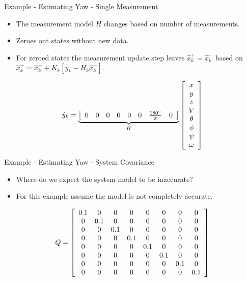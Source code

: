 \documentclass[hyperref={pdfpagelabels=false}]{beamer}
\begin{document}
\begin{frame}{Example - Estimating Yaw - Single Measurement}
\begin{itemize}
\item The measurement model $H$ changes based on number of measurements.
\item Zeroes out states without new data.
\item For zeroed states the measurement update step leaves $\hat{x}_k^+ = \hat{x}_k^-$ based on $\hat{x}_k^+ = \hat{x}_k^- + K_k\left[y_k - H_k\hat{x}_k^-\right]$.
\end{itemize}
\begin{align*}
\hat{y}_k = \underbrace{\left[\begin{array}{c c c c c c c c}
0 & 0 & 0 & 0 & 0 & 0 & \frac{180^\circ}{\pi} & 0 \\
\end{array}\right]}_{H}
\left[\begin{array}{c}
x \\ y \\ z \\ V \\ \theta \\ \phi \\ \psi \\ \omega
\end{array}\right]
\end{align*}
\end{frame}

\begin{frame}{Example - Estimating Yaw - System Covariance}
\begin{itemize}
\item Where do we expect the system model to be inaccurate?
\item For this example assume the model is not completely accurate.
\end{itemize}
\begin{align*}
Q = \left[\begin{array}{c c c c c c c c}
0.1 & 0 & 0 & 0 & 0 & 0 & 0 & 0 \\
0 & 0.1 & 0 & 0 & 0 & 0 & 0 & 0 \\
0 & 0 & 0.1 & 0 & 0 & 0 & 0 & 0 \\
0 & 0 & 0 & 0.1 & 0 & 0 & 0 & 0 \\
0 & 0 & 0 & 0 & 0.1 & 0 & 0 & 0 \\
0 & 0 & 0 & 0 & 0 & 0.1 & 0 & 0 \\
0 & 0 & 0 & 0 & 0 & 0 & 0.1 & 0 \\
0 & 0 & 0 & 0 & 0 & 0 & 0 & 0.1
\end{array}\right]
\end{align*}
\end{frame}
\end{document}
